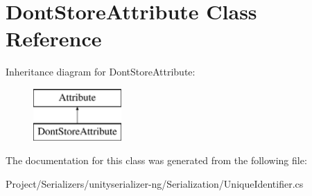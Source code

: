 \hypertarget{class_dont_store_attribute}{}\section{Dont\+Store\+Attribute Class Reference}
\label{class_dont_store_attribute}
Inheritance diagram for Dont\+Store\+Attribute\+:\begin{figure}[H]
\begin{center}
\leavevmode
\includegraphics[height=2.000000cm]{class_dont_store_attribute}
\end{center}
\end{figure}


The documentation for this class was generated from the following file\+:\begin{DoxyCompactItemize}
\item 
Project/\+Serializers/unityserializer-\/ng/\+Serialization/Unique\+Identifier.\+cs\end{DoxyCompactItemize}
